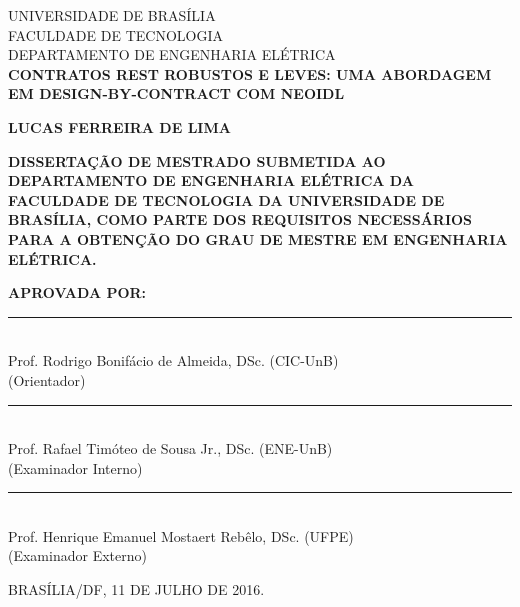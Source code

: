 \begin{bf}
\begin{center}
{\normalsize UNIVERSIDADE DE BRASÍLIA}\\
{\normalsize FACULDADE DE TECNOLOGIA}\\
{\normalsize DEPARTAMENTO DE ENGENHARIA ELÉTRICA}\\

\vspace{10mm}
{\large {\bf  CONTRATOS REST ROBUSTOS E LEVES: UMA ABORDAGEM EM
DESIGN-BY-CONTRACT COM NEOIDL }}

\vspace{10mm}
{\large {\bf LUCAS FERREIRA DE LIMA}}
\end{center}
\end{bf}

\vspace{10mm}

\noindent\MakeUppercase{ {\bf
Dissertação de Mestrado submetida ao
Departamento de Engenharia Elétrica
da Faculdade de Tecnologia da Universidade de Brasília,
como parte dos requisitos necessários para a obtenção do grau de mestre em
ENGENHARIA ELÉTRICA. }}

\vspace{5mm}

\noindent\MakeUppercase{ {\bf Aprovada por:}}

\vspace{10mm}

\begin{bf}
\noindent\rule{120mm}{0.1mm}\\
{ Prof. Rodrigo Bonifácio de Almeida, DSc. (CIC-UnB) }\\ 
{(Orientador)}

\vspace{7.5mm}

\noindent\rule{120mm}{0.1mm}\\
{ Prof. Rafael Timóteo de Sousa Jr., DSc. (ENE-UnB) }\\
{(Examinador Interno)}

\vspace{7.5mm}

\noindent\rule{120mm}{0.1mm}\\
{  Prof. Henrique Emanuel Mostaert Rebêlo, DSc. (UFPE) }\\
{(Examinador Externo)}

\vspace{7.5mm}

\vspace{7.5mm}
\noindent\MakeUppercase{Brasília/DF, 11 DE JULHO DE 2016.}
\end{bf}

\pagebreak


